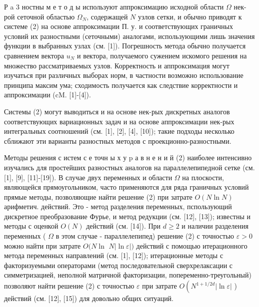 \documentclass[10pt]{article}
\begin{document}
Р a 3 ностны м е т о д ы используют аппроксимацию исходной области $\Omega$ нек-рой сеточной областью $\Omega_{N}$, содержащей $N$ узлов сетки, и обычно приводят к системе (2) на основе аппроксимации П. у. и соответствующих граничных условий их разностными (сеточными) аналогами, использующими лишь значения функции в выбранных узлах (см. [1]). Погрешность метода обычно получается сравнением вектора $u_{N}$ и вектора, получаемого сужением искомого решения на множество рассматриваемых узлов. Корректность и аппроксимация могут изучаться при различных выборах норм, в частности возможно использование принципа максим ума; сходимость получается как следствие корректности и аппроксимации (cM. [1]-[4]).



Системы (2) могут выводиться и на основе нек-рых дискретных аналогов соответствующих вариационных задач и на основе аппроксимации нек-рых интегральных соотношений (см. [1], [2], [4], [10]); такие подходы несколько сближают эти варианты разностных методов с проекционно-разностными.



Методы решения с истем с е точн ы х у $\mathrm{p}$ а в н е н и й (2) наиболее интенсивно изучались для простейших разностных аналогов на параллелепипедной сетке (см. [1], [9], [11]-[19]). В случае двух переменных и области $\Omega$ на плоскости, являющейся прямоугольником, часто применяются для ряда граничных условий прямые методы, позволяющие найти решение (2) при затрате $O(N \ln N)$ арифметич. действий. Это - метод разделения переменных, пспользующий дискретное преобразование Фурье, и метод редукции (см. [12], [13]); известны и методы с оценкой $O(N)$ действий (см. [14]). При $d \geqslant 2$ и наличии разделения переменных ( $\Omega$ в этом случае - параллелепипед) решение (2) с точностью $\varepsilon>0$ можно найти при затрате $O(N \ln$ $N|\ln \varepsilon|)$ действий с помощью итерационного метода переменных направлений (см. [1], [12]); итерационные методы с факторизуемыми операторами (метод последовательной сверхрелаксации с симметризацией, неполной матричной факторизации, попеременно-треугольный) позволяют найти решение (2) с точностью $\varepsilon$ при затрате $O\left(N^{1+1 / 2 d}|\ln \varepsilon|\right.$ ) действий (см. [12], [15]) для довольно общих ситуаций.
\end{document}
